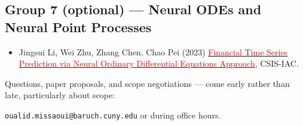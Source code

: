 \documentclass[11pt]{article}
\newcommand{\paper}[2]{\href{#2}{\textcolor{red}{#1}}}
\begin{document}
\subsection*{Group 7 (optional) --- Neural ODEs and Neural Point Processes}

\begin{itemize}
  \item Jingsui Li, Wei Zhu, Zhang Chen, Chao Pei (2023)
    \paper{Financial Time Series Prediction via Neural Ordinary Differential
    Equations Approach}{https://doi.org/10.1109/CSIS-IAC60628.2023.10364112},
    CSIS-IAC.
\end{itemize}

\vspace{1em}
\noindent
Questions, paper proposals, and scope negotiations --- come early rather than
late, particularly about scope:

\begin{center}
\texttt{oualid.missaoui@baruch.cuny.edu} \quad or during office hours.
\end{center}
\end{document}
